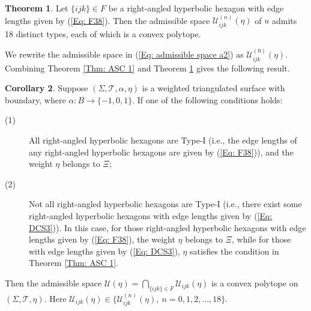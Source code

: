 \documentclass[12pt]{amsart}
\theoremstyle{definition}
\newtheorem{theorem}{Theorem}[section]
\newtheorem{corollary}[theorem]{Corollary}
\newtheorem{remark}[theorem]{Remark}
\begin{document}
\begin{theorem}\label{Thm: ASC 3}
Let $\{ijk\}\in F$ be a right-angled hyperbolic  hexagon with edge lengths given by (\ref{Eq: F38}).
Then the admissible space $\mathcal{U}^{(n)}_{ijk}(\eta)$ of $u$ admits 18 distinct types, each of which is a convex polytope.
\end{theorem}

We rewrite the admissible space in (\ref{Eq: admissible space a2}) as $\mathcal{U}^{(0)}_{ijk}(\eta)$.
Combining Theorem \ref{Thm: ASC 1} and Theorem \ref{Thm: ASC 3} gives the following result.

\begin{corollary}\label{Cor: ASC 3}
Suppose $(\Sigma,\mathcal{T},\alpha,\eta)$ is a weighted triangulated surface with boundary, where $\alpha: B\rightarrow \{-1,0,1\}$.
If one of the following conditions holds: 
\begin{description}
\item[(1)]
All right-angled hyperbolic hexagons are Type-I (i.e., the edge lengths of any right-angled hyperbolic hexagons are given by (\ref{Eq: F38})),
and the weight $\eta$ belongs to $\Xi$;
\item[(2)]
Not all right-angled hyperbolic hexagons are Type-I (i.e., there exist some right-angled hyperbolic hexagons with edge lengths given by (\ref{Eq: DCS3})).
In this case, for those right-angled hyperbolic hexagons with edge lengths given by (\ref{Eq: F38}),
the weight $\eta$ belongs to $\Xi$,
while for those with edge lengths given by (\ref{Eq: DCS3}), $\eta$ satisfies the condition in Theorem \ref{Thm: ASC 1}.
\end{description}
Then the admissible space
$\mathcal{U}(\eta)=\bigcap_{\{ijk\}\in F}\mathcal{U}_{ijk}(\eta)$ is a convex polytope on $(\Sigma,\mathcal{T},\eta)$.
Here $\mathcal{U}_{ijk}(\eta)\in \{\mathcal{U}^{(n)}_{ijk}(\eta),\ n=0,1,2,...,18\}$.
\end{corollary}


\end{document}
